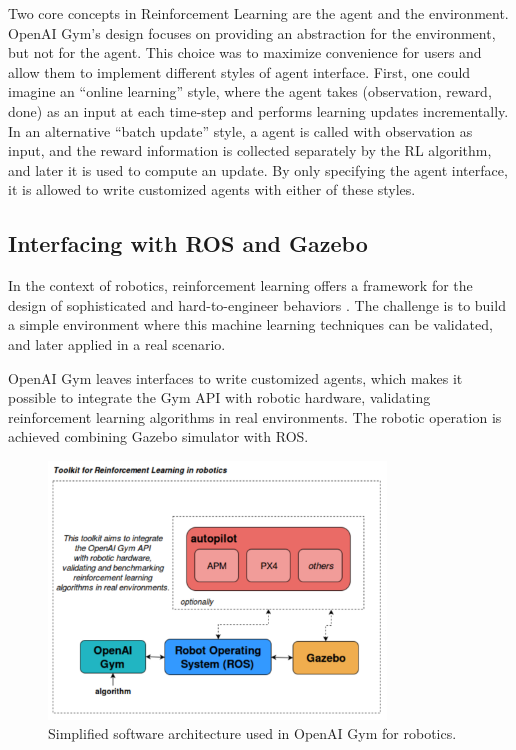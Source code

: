 Two core concepts in Reinforcement Learning are the agent and the environment. OpenAI Gym's design focuses on providing an abstraction for the environment, but not for the agent. This choice was to maximize convenience for users and allow them to implement different styles of agent interface. First, one could imagine an ``online learning'' style, where the agent takes (observation, reward, done) as an input at each time-step and performs learning updates incrementally. In an alternative ``batch update'' style, a agent is called with observation as input, and the reward information is collected separately by the RL algorithm, and later it is used to compute an update. By only specifying the agent interface, it is allowed to write customized agents with either of these styles.

\subsection{Interfacing with ROS and Gazebo}

In the context of robotics, reinforcement learning offers a framework for the design of sophisticated and hard-to-engineer behaviors \cite{RLsurvey2013}. The challenge is to build a simple environment where this machine learning techniques can be validated, and later applied in a real scenario.

OpenAI Gym leaves interfaces to write customized agents, which makes it possible to integrate the Gym API with robotic hardware, validating reinforcement learning algorithms in real environments. The robotic operation is achieved combining Gazebo simulator with ROS.

\begin{figure}[h]
\centering
\includegraphics[width=0.8\textwidth]{figs/ch2/toolkit-of-openaigym}
\caption{Simplified software architecture used in OpenAI Gym for robotics.}
\label{fig:openai-archi}
\end{figure}

